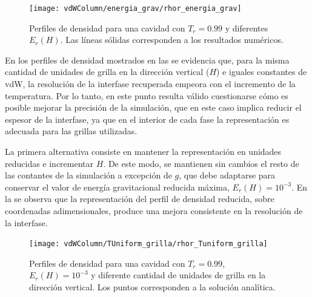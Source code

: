 \begin{figure}[ht]
	\centering
	\texttt{[image: vdWColumn/energia\_grav/rhor\_energia\_grav]}
	\caption{Perfiles de densidad para una cavidad con $T_r = 0.99$ y diferentes $E_r(H)$. Las l\'ineas s\'olidas corresponden a los resultados num\'ericos.}
	\label{fig:vdWColumn_rhor_egrav}
\end{figure}

En los perfiles de densidad mostrados en las  se evidencia que, para la misma cantidad de unidades de grilla en la direcci\'on vertical ($H$) e iguales constantes de vdW, la resoluci\'on de la interfase recuperada empeora con el incremento de la temperatura. Por lo tanto, en este punto resulta v\'alido cuestionarse c\'omo es posible mejorar la precisi\'on de la simulaci\'on, que en este caso implica reducir el espesor de la interfase, ya que en el interior de cada fase la representaci\'on es adecuada para las grillas utilizadas.

La primera alternativa consiste en mantener la representaci\'on en unidades reducidas e incrementar $H$. De este modo, se mantienen sin cambios el resto de las contantes de la simulaci\'on a excepci\'on de $g$, que debe adaptarse para conservar el valor de energ\'ia gravitacional reducida m\'axima, $E_r(H) = 10^{-3}$. En la  se observa que la representaci\'on del perfil de densidad reducida, sobre coordenadas adimensionales, produce una mejora consistente en la resoluci\'on de la interfase.

\begin{figure}[ht]
	\centering
	\texttt{[image: vdWColumn/TUniform\_grilla/rhor\_Tuniform\_grilla]}
	\caption{Perfiles de densidad para una cavidad con $T_r = 0.99$, $E_r(H) = 10^{-3}$ y diferente cantidad de unidades de grilla en la direcci\'on vertical. Los puntos corresponden a la soluci\'on anal\'itica.}
	\label{fig:vdWColumn_rhor_grilla}
\end{figure}
\FloatBarrier

